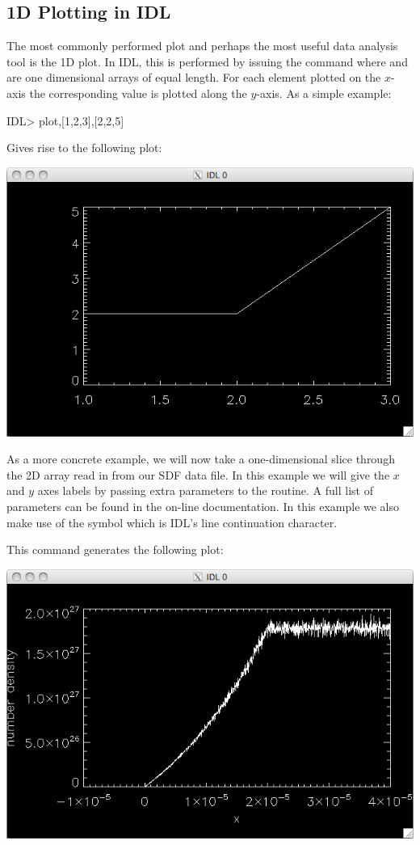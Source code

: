 \subsection{1D Plotting in IDL}
  The most commonly performed plot and perhaps the most useful data analysis
  tool is the 1D plot. In IDL, this is performed by issuing the command
   where  and  are one dimensional arrays of
  equal length. For each element  plotted on the $x$-axis the
  corresponding value  is plotted along the $y$-axis. As a
  simple example:
\begin{boxverbatim}
IDL> plot,[1,2,3],[2,2,5]
\end{boxverbatim}
  Gives rise to the following plot:
  \begin{center}
    \includegraphics[width=0.7\linewidth]{images/idl_simple_plot}
  \end{center}

  As a more concrete example, we will now take a one-dimensional slice through
  the 2D\linebreak {} array read in from our SDF data file.
  In this example we will give the $x$ and $y$ axes labels by passing extra
  parameters to the  routine. A full list of parameters can be found
  in the on-line documentation. In this example we also make use of the
  \qtt{\$} symbol which is IDL's line continuation character.

  This command generates the following plot:
  \begin{center}
    \includegraphics[width=0.7\linewidth]{images/idl_plot}
  \end{center}

